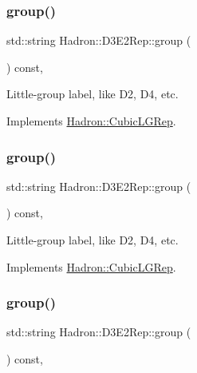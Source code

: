 \subsubsection{\texorpdfstring{group()}{group()}\hspace{0.1cm}{\footnotesize\ttfamily [3/5]}}
{\footnotesize\ttfamily std\+::string Hadron\+::\+D3\+E2\+Rep\+::group (\begin{DoxyParamCaption}{ }\end{DoxyParamCaption}) const\hspace{0.3cm}{\ttfamily [inline]}, {\ttfamily [virtual]}}

Little-\/group label, like D2, D4, etc. 

Implements \mbox{\hyperlink{structHadron_1_1CubicLGRep_a9bdb14b519a611d21379ed96a3a9eb41}{Hadron\+::\+Cubic\+L\+G\+Rep}}.

\mbox{\label{structHadron_1_1D3E2Rep_a81f6acc24c457b0fcdbbc468848dbfa1}} 
\subsubsection{\texorpdfstring{group()}{group()}\hspace{0.1cm}{\footnotesize\ttfamily [4/5]}}
{\footnotesize\ttfamily std\+::string Hadron\+::\+D3\+E2\+Rep\+::group (\begin{DoxyParamCaption}{ }\end{DoxyParamCaption}) const\hspace{0.3cm}{\ttfamily [inline]}, {\ttfamily [virtual]}}

Little-\/group label, like D2, D4, etc. 

Implements \mbox{\hyperlink{structHadron_1_1CubicLGRep_a9bdb14b519a611d21379ed96a3a9eb41}{Hadron\+::\+Cubic\+L\+G\+Rep}}.

\mbox{\label{structHadron_1_1D3E2Rep_a81f6acc24c457b0fcdbbc468848dbfa1}} 
\subsubsection{\texorpdfstring{group()}{group()}\hspace{0.1cm}{\footnotesize\ttfamily [5/5]}}
{\footnotesize\ttfamily std\+::string Hadron\+::\+D3\+E2\+Rep\+::group (\begin{DoxyParamCaption}{ }\end{DoxyParamCaption}) const\hspace{0.3cm}{\ttfamily [inline]}, {\ttfamily [virtual]}}

